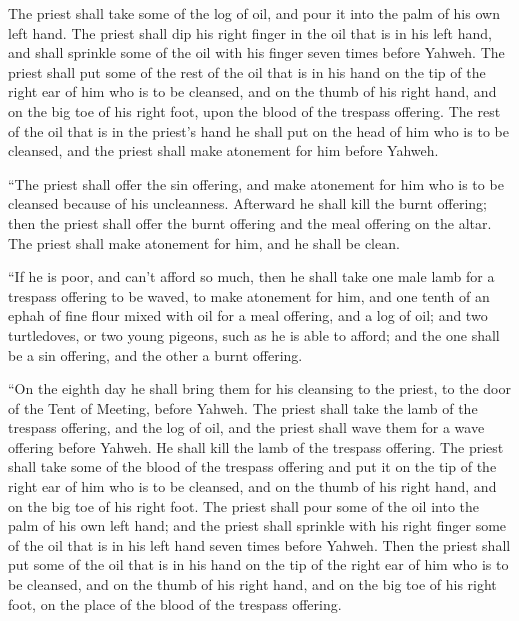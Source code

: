 {The priest shall take some of the log of oil, and pour it into the palm of his own left hand.
The priest shall dip his right finger in the oil that is in his left hand, and shall sprinkle some of the oil with his finger seven times before Yahweh.
The priest shall put some of the rest of the oil that is in his hand on the tip of the right ear of him who is to be cleansed, and on the thumb of his right hand, and on the big toe of his right foot, upon the blood of the trespass offering.
The rest of the oil that is in the priest’s hand he shall put on the head of him who is to be cleansed, and the priest shall make atonement for him before Yahweh.
\par }{\PP {}“The priest shall offer the sin offering, and make atonement for him who is to be cleansed because of his uncleanness. Afterward he shall kill the burnt offering;
then the priest shall offer the burnt offering and the meal offering on the altar. The priest shall make atonement for him, and he shall be clean.
\par }{\PP {}“If he is poor, and can’t afford so much, then he shall take one male lamb for a trespass offering to be waved, to make atonement for him, and one tenth of an ephah of fine flour mixed with oil for a meal offering, and a log of oil;
and two turtledoves, or two young pigeons, such as he is able to afford; and the one shall be a sin offering, and the other a burnt offering.
\par }{\PP {}“On the eighth day he shall bring them for his cleansing to the priest, to the door of the Tent of Meeting, before Yahweh.
The priest shall take the lamb of the trespass offering, and the log of oil, and the priest shall wave them for a wave offering before Yahweh.
He shall kill the lamb of the trespass offering. The priest shall take some of the blood of the trespass offering and put it on the tip of the right ear of him who is to be cleansed, and on the thumb of his right hand, and on the big toe of his right foot.
The priest shall pour some of the oil into the palm of his own left hand;
and the priest shall sprinkle with his right finger some of the oil that is in his left hand seven times before Yahweh.
Then the priest shall put some of the oil that is in his hand on the tip of the right ear of him who is to be cleansed, and on the thumb of his right hand, and on the big toe of his right foot, on the place of the blood of the trespass offering.
}
